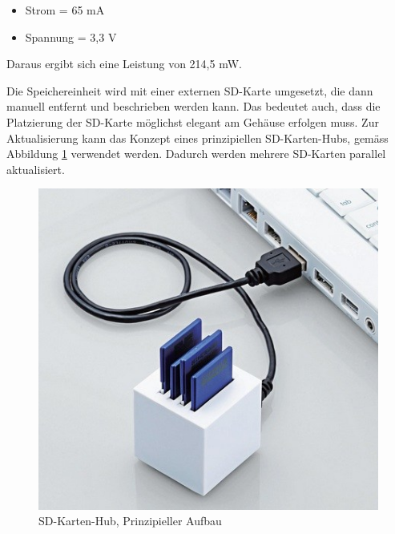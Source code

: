 \begin{itemize}
\item Strom = 65 mA
\item Spannung = 3,3 V
\end{itemize}
Daraus ergibt sich eine Leistung von 214,5 mW.

Die Speichereinheit wird mit einer externen SD-Karte umgesetzt, die dann manuell entfernt und beschrieben werden kann. Das bedeutet auch, dass die Platzierung der SD-Karte möglichst elegant am Gehäuse erfolgen muss. Zur Aktualisierung kann das Konzept eines prinzipiellen SD-Karten-Hubs, gemäss Abbildung \ref{fig:sdKartenHub} verwendet werden. Dadurch werden mehrere SD-Karten parallel aktualisiert.

\begin{figure}[H]
\begin{center}
	\includegraphics[scale = 0.4]{data/SDKartenHub}
	\caption{SD-Karten-Hub, Prinzipieller Aufbau}
	\label{fig:sdKartenHub}
\end{center}
\end{figure}

